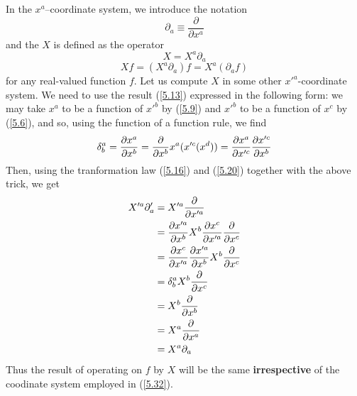 In the $x^{a}$--coordinate system, we introduce the notation $$\partial_a\equiv\frac{\partial}{\partial x^{a}}$$ and the $X$ is defined as the operator
\begin{equation}\label{5.32}
  \boxed{X=X^{a}\partial _a}
\end{equation}
\begin{equation}\label{5.33}
  Xf=(X^{a}\partial_a)f=X^{a}(\partial _a f)
\end{equation}
for any real-valued function $f$. Let us compute $X$ in some other $x'^{a}$-coordinate system. We need to use the result (\ref{5.13}) expressed in the following form: we may take $x^{a}$ to be a function of $x'^b$ by (\ref{5.9}) and $x'^b$ to be a function of $x^c$ by (\ref{5.6}), and so, using the function of a function rule, we find
\begin{equation}\label{5.34}
  \delta^{a}_b=\pdv{x^{a}}{x^b}=\frac{\partial}{\partial x^b}x^{a}(x'^c(x^d))=\pdv{x^{a}}{x'^c}\pdv{x'^c}{x^b}
\end{equation}
Then, using the tranformation law (\ref{5.16}) and (\ref{5.20}) together with the above trick, we get
\begin{align*}
  X'^{a}\partial '_a&=X'^{a}\frac{\partial}{\partial x'^{a}}\\
                    &=\pdv{x'^{a}}{x^b}X^b\pdv{x^c}{x'^{a}}\frac{\partial}{\partial  x^c}\\
                    &=\pdv{x^c}{x'^{a}}\pdv{x'^{a}}{x^b}X^b\frac{\partial}{\partial x^c}\\
                    &=\delta^{a}_bX^b\frac{\partial}{\partial x^c}\\
                    &=X^b\frac{\partial}{\partial x^b}\\
                    &=X^{a}\frac{\partial}{\partial x^{a}}\\
                    &=X^{a}\partial_a
\end{align*}
Thus the result of operating on $f$ by $X$ will be the same \textbf{irrespective} of the coodinate system employed in (\ref{5.32}).

